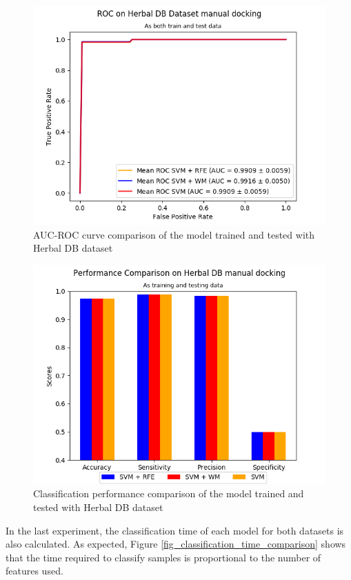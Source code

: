 \documentclass[conference]{IEEEtran}
\begin{document}
\begin{figure}
	\includegraphics[scale=0.5]{../images/03-evaluate-4_roc_chart.png}
	\caption{AUC-ROC curve comparison of the model trained and tested with Herbal DB dataset}
	\label{fig_roc_comparison_herbaldb_only}
\end{figure}

\begin{figure}
	\includegraphics[scale=0.5]{../images/03-evaluate-4_scores_chart.png}
	\caption{Classification performance comparison of the model trained and tested with Herbal DB dataset}
	\label{fig_performance_comparison_herbaldb_only}
\end{figure}	

In the last experiment, the classification time of each model for both datasets is also calculated. As expected, Figure \ref{fig_classification_time_comparison} shows that the time required to classify samples is proportional to the number of features used.
\end{document}
